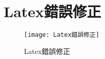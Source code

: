 \chapter{Latex錯誤修正}

\begin{figure}[!ht]
\centering
\texttt{[image: Latex錯誤修正]}
\caption{\Large Latex錯誤修正}
\label{Latex錯誤修正}
\end{figure}

\newpage
